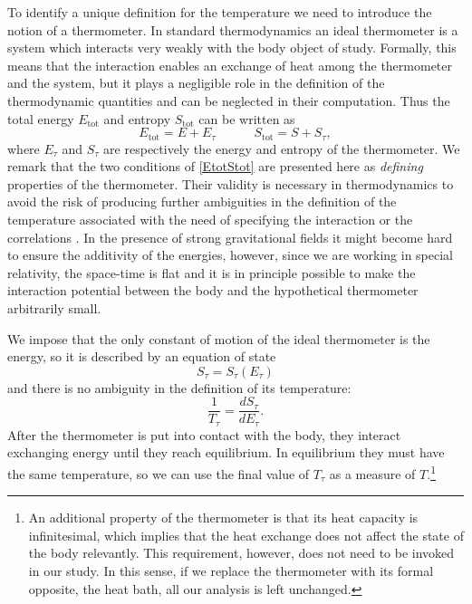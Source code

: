\documentclass[twocolumn,usenatbib]{mnras2}
\newcommand{\spc}{\quad \quad \quad}
\begin{document}
To identify a unique definition for the temperature we need to introduce the notion of a thermometer. In standard thermodynamics an ideal thermometer is a system which interacts very weakly with the body object of study. Formally, this means that the interaction enables an exchange of heat among the thermometer and the system, but it plays a negligible role in the definition of the thermodynamic quantities and can be neglected in their computation. Thus the total energy $E_{\text{tot}}$ and entropy $S_{\text{tot}}$ can be written as 
\begin{equation}\label{EtotStot}
E_{\text{tot}} = E+E_\tau  \spc  S_{\text{tot}}=S+S_\tau,
\end{equation}
where $E_\tau$ and $S_\tau$ are respectively the energy and entropy of the thermometer. We remark that the two conditions of \eqref{EtotStot} are presented here as \textit{defining} properties of the thermometer. Their validity is necessary in thermodynamics to avoid the risk of producing further ambiguities in the definition of the temperature associated with the need of specifying the interaction \citep{Oppenheim2003} or the correlations \citep{Oppenheim2003B}. In the presence of strong gravitational fields it might become hard to ensure the additivity of the energies, however, since we are working in special relativity, the space-time is flat and it is in principle possible to make the interaction potential between the body and the hypothetical thermometer arbitrarily small.

 We impose that the only constant of motion of the ideal thermometer is the energy, so it is described by an equation of state
\begin{equation}\label{sss}
S_\tau =S_\tau (E_\tau)
\end{equation}
and there is no ambiguity in the definition of its temperature:
\begin{equation}
\dfrac{1}{T_\tau} = \dfrac{dS_\tau}{dE_\tau}.
\end{equation}
After the thermometer is put into contact with the body, they interact exchanging energy until they reach equilibrium. In equilibrium they must have the same temperature, so we can use the final value of $T_\tau$ as a measure of $T$.\footnote{An additional property of the thermometer is that its heat capacity is infinitesimal, which implies that the heat exchange does not affect the state of the body relevantly. This requirement, however, does not need to be invoked in our study. In this sense, if we replace the thermometer with its formal opposite, the heat bath, all our analysis is left unchanged.}
\end{document}
